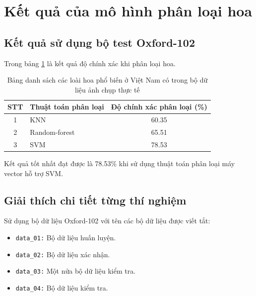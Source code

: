 \documentclass[12pt]{report}
\begin{document}
				
				
				
		\section{Kết quả của mô hình phân loại hoa}
		\subsection{Kết quả sử dụng bộ test Oxford-102}
		Trong bảng \ref{tbl:table ket qua phan loai hoa} là kết quả độ chính xác khi phân loại hoa.
				
		\begin{table}[h]
			\centering
			\caption{Bảng danh sách các loài hoa phổ biến ở Việt Nam có trong bộ dữ liệu ảnh chụp thực tế}
			\label{tbl:table ket qua phan loai hoa}
			\begin{tabular}{|c|l|c|}
				\hline
				\textbf{STT} & \textbf{Thuật toán phân loại} & \textbf{Độ chính xác phân loại (\%)} \\ \hline
				1            & KNN                                 & 60.35                                        \\ \hline
				2            & Random-forest                       & 65.51                                        \\ \hline
				3            & SVM                                 & 78.53                                        \\ \hline
			\end{tabular}
		\end{table}
		Kết quả tốt nhất đạt được là 78.53\% khi sử dụng thuật toán phân loại máy vector hỗ trợ SVM.
				
		\subsection{Giải thích chi tiết từng thí nghiệm}
		Sử dụng bộ dữ liệu Oxford-102 với tên các bộ dữ liệu được viết tắt:
		\begin{itemize}
			\item \texttt{data\_01:} Bộ dữ liệu huấn luyện.
			\item \texttt{data\_02:} Bộ dữ liệu xác nhận.
			\item \texttt{data\_03:} Một nửa bộ dữ liệu kiểm tra.
			\item \texttt{data\_04:} Bộ dữ liệu kiểm tra.
		\end{itemize}
				
\end{document}
